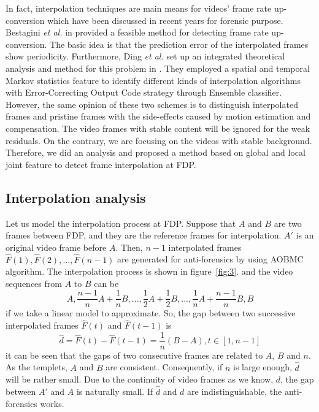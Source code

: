 \documentclass[pdftex,twocolumn,epjc3]{svjour3}          %
\begin{document}
In fact, interpolation techniques are main means for videos' frame rate up-conversion which have been discussed in recent years for forensic purpose. Bestagini \emph{et al.} in \cite{A17} provided a feasible method for detecting frame rate up-conversion. The basic idea is that the prediction error of the interpolated frames show periodicity. Furthermore, Ding \emph{et al.} set up an integrated theoretical analysis and method for this problem in \cite{A18}. They employed a spatial and temporal Markov statistics feature to identify different kinds of interpolation algorithms with Error-Correcting Output Code strategy through Ensemble classifier. However, the same opinion of these two schemes is to distinguish interpolated frames and pristine frames with the side-effects caused by motion estimation and compensation. The video frames with stable content will be ignored for the weak residuals. On the contrary, we are focusing on the videos with stable background. Therefore, we did an analysis and proposed a method based on global and local joint feature to detect frame interpolation at FDP.

\subsection{Interpolation analysis}
\label{sec:sub32}

Let us model the interpolation process at FDP. Suppose that $A$ and $B$ are two frames between FDP, and they are the reference frames for interpolation. $A'$ is an original video frame before $A$. Then, $n-1$ interpolated frames $\hat{F}(1),\hat{F}(2),...,\hat{F}(n-1)$ are generated for anti-forensics by using AOBMC algorithm. The interpolation process is shown in figure~\ref{fig:3}. and the video sequences
from $A$ to $B$ can be $$A,\frac{n-1}{n}A+\frac{1}{n}B,...,\frac{1}{2}A+\frac{1}{2}B,...,\frac{1}{n}A+\frac{n-1}{n}B,B$$
if we take a linear model to approximate. So, the gap between two successive interpolated frames $\hat{F}(t)$ and $\hat{F}(t-1)$ is
\begin{equation}
\hat{d}=\hat{F}(t)-\hat{F}(t-1)=\frac{1}{n}(B-A),t\in[1,n-1]
\end{equation}
it can be seen that the gaps of two consecutive frames are related to $A$, $B$ and $n$. As the templets, $A$ and $B$ are consistent. Consequently, if $n$ is large enough, $\hat{d}$ will be rather small. Due to the continuity of video frames as we know, $d$, the gap between $A'$ and $A$ is naturally small. If $\hat{d}$ and $d$ are indistinguishable, the
anti-forensics works.
\end{document}
